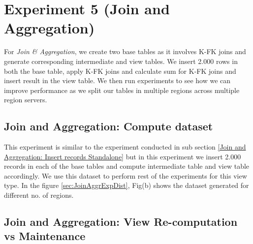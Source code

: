 \documentclass[11pt,a4paper,bibtotoc,idxtotoc,headsepline,footsepline,footexclude,BCOR12mm,DIV13]{scrbook}
\begin{document}
\section{Experiment 5 (Join and Aggregation)}
\label{(sec:Join and Aggregation Dist)} 

For \emph{Join \& Aggregation}, we create two base tables as it involves K-FK joins and generate corresponding intermediate and view tables. We insert 2.000 rows in both the base table, apply K-FK joins and calculate sum for K-FK joins and insert result in the view table. We then run experiments to see how we can improve performance as we split our tables in multiple regions across multiple region servers.

\subsection{Join and Aggregation: Compute dataset}
\label{Join and Aggregation: Compute base tables and view table}

This experiment is similar to the experiment conducted in sub section \ref{Join and Aggregation: Insert records Standalone} but in this experiment we insert 2.000 records in each of the base tables and compute intermediate table and view table accordingly. We use this dataset to perform rest of the experiments for this view type. In the figure \ref{sec:JoinAggrExpDist}, Fig(b) shows the dataset generated for different no. of regions.


\subsection{Join and Aggregation: View Re-computation vs Maintenance}
\label{Join and Aggregation: View Re-computation vs Maintenance Distributed}
\end{document}
